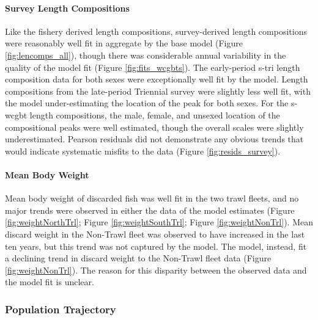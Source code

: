 \documentclass[11pt,
  english,
  letterpaper,
]{article}
\begin{document}
\hypertarget{survey-length-compositions}{%
\paragraph{Survey Length Compositions}\label{survey-length-compositions}}

Like the fishery derived length compositions, survey-derived length compositions were reasonably well fit in aggregate by the base model (Figure \ref{fig:lencomps_all}), though there was considerable annual variability in the quality of the model fit (Figure \ref{fig:fits_wcgbts}). The early-period \gls{s-tri} length composition data for both sexes were exceptionally well fit by the model. Length compositions from the late-period Triennial survey were slightly less well fit, with the model under-estimating the location of the peak for both sexes. For the \gls{s-wcgbt} length compositions, the male, female, and unsexed location of the compositional peaks were well estimated, though the overall scales were slightly underestimated. Pearson residuals did not demonstrate any obvious trends that would indicate systematic misfits to the data (Figure \ref{fig:resids_survey}).

\hypertarget{mean-body-weight}{%
\paragraph{Mean Body Weight}\label{mean-body-weight}}

Mean body weight of discarded fish was well fit in the two trawl fleets, and no major trends were observed in either the data of the model estimates (Figure \ref{fig:weightNorthTrl}; Figure \ref{fig:weightSouthTrl}; Figure \ref{fig:weightNonTrl}). Mean discard weight in the Non-Trawl fleet was observed to have increased in the last ten years, but this trend was not captured by the model. The model, instead, fit a declining trend in discard weight to the Non-Trawl fleet data (Figure \ref{fig:weightNonTrl}). The reason for this disparity between the observed data and the model fit is unclear.

\hypertarget{population-trajectory}{%
\subsubsection{Population Trajectory}\label{population-trajectory}}
\end{document}
